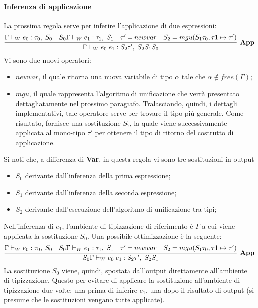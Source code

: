 \documentclass[10pt,a4paper]{article}
\begin{document}
\paragraph{Inferenza di applicazione}
La prossima regola serve per inferire l'applicazione di due espressioni:
\[ \infer[\textbf{App}]{\Gamma \vdash_W e_0 \; e_1 : S_2\tau', \; S_2S_1S_0}{\Gamma \vdash_W e_0 : \tau_0, \; S_0 & S_0\Gamma \vdash_W e_1 : \tau_1, \; S_1 & \tau' = newvar & S_2 = mgu(S_1\tau_0, \tau1 \mapsto \tau')} \]
Vi sono due nuovi operatori:
\begin{itemize}
    \item $ newvar $, il quale ritorna una nuova variabile di tipo $ \alpha $ tale che $ \alpha \notin free(\Gamma) $;
    \item $ mgu $, il quale rappresenta l'algoritmo di unificazione che verrà presentato dettagliatamente nel prossimo
    paragrafo. Tralasciando, quindi, i dettagli implementativi, tale operatore serve per trovare il tipo più generale.
    Come risultato, fornisce una sostituzione $ S_2 $, la quale viene successivamente applicata al mono-tipo $ \tau' $
    per ottenere il tipo di ritorno del costrutto di applicazione.
\end{itemize}
Si noti che, a differenza di \textbf{Var}, in questa regola vi sono tre sostituzioni in output
\begin{itemize}
    \item $ S_0 $ derivante dall'inferenza della prima espressione;
    \item $ S_1 $ derivante dall'inferenza della seconda espressione;
    \item $ S_2 $ derivante dall'esecuzione dell'algoritmo di unificazione tra tipi;
\end{itemize}
Nell'inferenza di $ e_1 $, l'ambiente di tipizzazione di riferimento è $ \Gamma $ a cui viene applicata la sostituzione
$ S_0 $. Una possibile ottimizzazione è la seguente:
\[ \infer[\textbf{App}]{S_0\Gamma \vdash_W e_0 \; e_1 : S_2\tau', \; S_2S_1}{\Gamma \vdash_W e_0 : \tau_0, \; S_0 & S_0\Gamma \vdash_W e_1 : \tau_1, \; S_1 & \tau' = newvar & S_2 = mgu(S_1\tau_0, \tau1 \mapsto \tau')} \]
La sostituzione $ S_0 $ viene, quindi, spostata dall'output direttamente all'ambiente di tipizzazione. Questo per evitare
di applicare la sostituzione all'ambiente di tipizzazione due volte: una prima di inferire $ e_1 $, una dopo il risultato
di output (si presume che le sostituzioni vengano tutte applicate).
\end{document}
